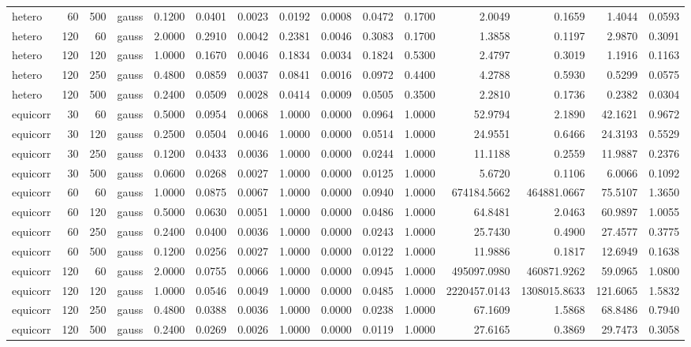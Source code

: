 \begin{tabular}{lrrlrrrrrrrrrrr}
hetero & 60 & 500 & gauss & 0.1200 & 0.0401 & 0.0023 & 0.0192 & 0.0008 & 0.0472 & 0.1700 & 2.0049 & 0.1659 & 1.4044 & 0.0593 \\
hetero & 120 & 60 & gauss & 2.0000 & 0.2910 & 0.0042 & 0.2381 & 0.0046 & 0.3083 & 0.1700 & 1.3858 & 0.1197 & 2.9870 & 0.3091 \\
hetero & 120 & 120 & gauss & 1.0000 & 0.1670 & 0.0046 & 0.1834 & 0.0034 & 0.1824 & 0.5300 & 2.4797 & 0.3019 & 1.1916 & 0.1163 \\
hetero & 120 & 250 & gauss & 0.4800 & 0.0859 & 0.0037 & 0.0841 & 0.0016 & 0.0972 & 0.4400 & 4.2788 & 0.5930 & 0.5299 & 0.0575 \\
hetero & 120 & 500 & gauss & 0.2400 & 0.0509 & 0.0028 & 0.0414 & 0.0009 & 0.0505 & 0.3500 & 2.2810 & 0.1736 & 0.2382 & 0.0304 \\
equicorr & 30 & 60 & gauss & 0.5000 & 0.0954 & 0.0068 & 1.0000 & 0.0000 & 0.0964 & 1.0000 & 52.9794 & 2.1890 & 42.1621 & 0.9672 \\
equicorr & 30 & 120 & gauss & 0.2500 & 0.0504 & 0.0046 & 1.0000 & 0.0000 & 0.0514 & 1.0000 & 24.9551 & 0.6466 & 24.3193 & 0.5529 \\
equicorr & 30 & 250 & gauss & 0.1200 & 0.0433 & 0.0036 & 1.0000 & 0.0000 & 0.0244 & 1.0000 & 11.1188 & 0.2559 & 11.9887 & 0.2376 \\
equicorr & 30 & 500 & gauss & 0.0600 & 0.0268 & 0.0027 & 1.0000 & 0.0000 & 0.0125 & 1.0000 & 5.6720 & 0.1106 & 6.0066 & 0.1092 \\
equicorr & 60 & 60 & gauss & 1.0000 & 0.0875 & 0.0067 & 1.0000 & 0.0000 & 0.0940 & 1.0000 & 674184.5662 & 464881.0667 & 75.5107 & 1.3650 \\
equicorr & 60 & 120 & gauss & 0.5000 & 0.0630 & 0.0051 & 1.0000 & 0.0000 & 0.0486 & 1.0000 & 64.8481 & 2.0463 & 60.9897 & 1.0055 \\
equicorr & 60 & 250 & gauss & 0.2400 & 0.0400 & 0.0036 & 1.0000 & 0.0000 & 0.0243 & 1.0000 & 25.7430 & 0.4900 & 27.4577 & 0.3775 \\
equicorr & 60 & 500 & gauss & 0.1200 & 0.0256 & 0.0027 & 1.0000 & 0.0000 & 0.0122 & 1.0000 & 11.9886 & 0.1817 & 12.6949 & 0.1638 \\
equicorr & 120 & 60 & gauss & 2.0000 & 0.0755 & 0.0066 & 1.0000 & 0.0000 & 0.0945 & 1.0000 & 495097.0980 & 460871.9262 & 59.0965 & 1.0800 \\
equicorr & 120 & 120 & gauss & 1.0000 & 0.0546 & 0.0049 & 1.0000 & 0.0000 & 0.0485 & 1.0000 & 2220457.0143 & 1308015.8633 & 121.6065 & 1.5832 \\
equicorr & 120 & 250 & gauss & 0.4800 & 0.0388 & 0.0036 & 1.0000 & 0.0000 & 0.0238 & 1.0000 & 67.1609 & 1.5868 & 68.8486 & 0.7940 \\
equicorr & 120 & 500 & gauss & 0.2400 & 0.0269 & 0.0026 & 1.0000 & 0.0000 & 0.0119 & 1.0000 & 27.6165 & 0.3869 & 29.7473 & 0.3058 \\
\bottomrule
\end{tabular}
